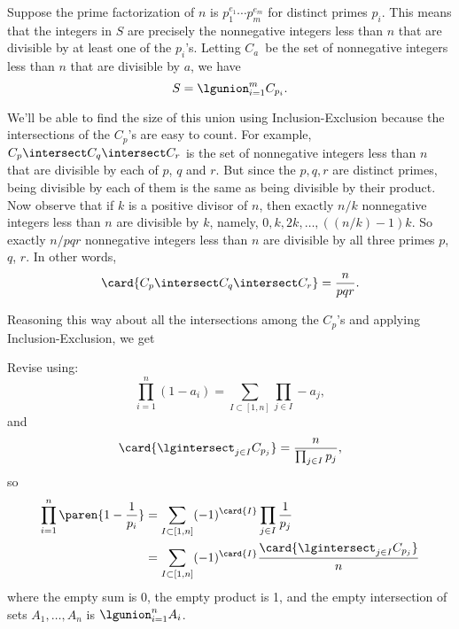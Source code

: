 Suppose the prime factorization of $n$ is $p_1^{e_1}\cdots p_m^{e_m}$
for distinct primes $p_i$.  This means that the integers in $S$ are
precisely the nonnegative integers less than $n$ that are divisible by at
least one of the $p_i$'s.  Letting $C_a$~be the set of nonnegative
integers less than $n$ that are divisible by $a$, we have
\[
S = \lgunion_{i=1}^m C_{p_i}.
\]

We'll be able to find the size of this union using Inclusion-Exclusion
because the intersections of the $C_p$'s are easy to count.  For example,
$C_p \intersect C_q \intersect C_r$ is the set of nonnegative integers less
than $n$ that are divisible by each of $p$, $q$ and $r$.  But since
the $p,q,r$ are distinct primes, being divisible by each of them is
the same as being divisible by their product.  Now observe that if $k$ is
a positive divisor of $n$, then exactly $n/k$ nonnegative integers less
than $n$ are divisible by $k$, namely, $0,k,2k,\dots,((n/k)-1)k$.  So
exactly $n/pqr$ nonnegative integers less than $n$ are divisible by
all three primes $p$, $q$, $r$.  In other words,
\[
\card{C_p \intersect C_q \intersect C_r} = \frac{n}{pqr}.
\]

Reasoning this way about all the intersections among the $C_p$'s and
applying Inclusion-Exclusion, we get
\begin{editingnotes}
Revise using:
\[
\prod_{i=1}^n (1-a_i) = \sum_{I\subset [1,n]} \prod_{j\in I} -a_j,
\]
and
\[
\card{\lgintersect_{j \in I} C_{p_j}} = \frac{n}{\prod_{j \in I} {p_j}},
\]
so
\begin{align*}
\prod_{i=1}^n \paren{1-\frac{1}{p_i}}
 & = \sum_{I\subset [1,n]} (-1)^{\card{I}}\prod_{j \in I} \frac{1}{p_j}\\
 & = \sum_{I\subset [1,n]} (-1)^{\card{I}}\frac{\card{\lgintersect_{j \in I} C_{p_j}}}{n}
\end{align*}
where the empty sum is 0, the empty product is 1, and the empty intersection of sets $A_1,\dots,A_n$ is
$\lgunion_{i=1}^n A_i$.
\end{editingnotes}

